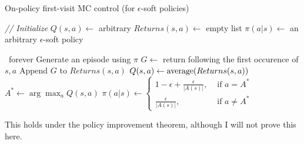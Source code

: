     \begin{algorithm}
        \caption{On-policy first-visit MC control (for $\epsilon$-soft 
        policies)}
        \begin{algorithmic}
            \State \textit{// Initialize}
                \State $Q(s,a) \gets$ arbitrary
                \State $Returns(s,a) \gets$ empty list
                \State $\pi(a|s) \gets$ an arbitrary $\epsilon$-soft policy
            \EndFor
            
            \Loop\, forever
                \State Generate an episode using $\pi$
                    \State $G \gets$ return following the first occurence of 
                    $s,a$
                    \State Append $G$ to $Returns(s,a)$
                    \State $Q(s,a) \gets \text{average}(Returns(s,a))$
                \EndFor
                    \State $A^* \gets \arg\max_a Q(s,a)$
                        \State $\pi(a|s) \gets \begin{cases}
                        1-\epsilon + \frac{\epsilon}{|A(s)|},&\text{ if 
                        }a=A^*\\
                        \frac{\epsilon}{|A(s)|},&\text{ if } a \neq A^*
                        \end{cases}$
                    \EndFor
                \EndFor
            \EndLoop
        \end{algorithmic}
    \end{algorithm}
    
    This holds under the policy improvement theorem, although I will not prove 
    this here.
